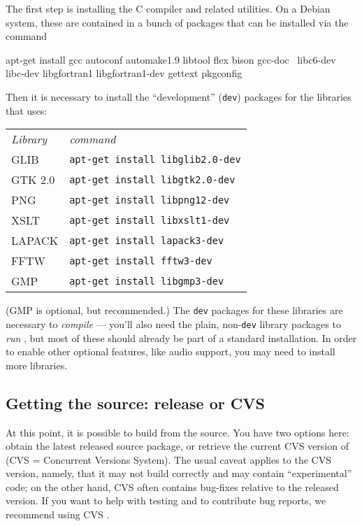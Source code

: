 The first step is installing the C compiler and related utilities. On
a Debian system, these are contained in a bunch of packages that can
be installed via the command
\begin{code}
apt-get install gcc autoconf automake1.9 libtool flex bison gcc-doc \
libc6-dev libc-dev libgfortran1 libgfortran1-dev gettext pkgconfig
\end{code}

Then it is necessary to install the ``development'' (\texttt{dev})
packages for the libraries that \app{gretl} uses:

\begin{center}
  \begin{tabular}{ll}
    \textit{Library} & \textit{command} \\ [4pt]
    GLIB & \texttt{apt-get install libglib2.0-dev} \\
    GTK 2.0 & \texttt{apt-get install libgtk2.0-dev} \\
    PNG & \texttt{apt-get install libpng12-dev} \\
    XSLT & \texttt{apt-get install libxslt1-dev} \\
    LAPACK & \texttt{apt-get install lapack3-dev} \\
    FFTW & \texttt{apt-get install fftw3-dev} \\
    GMP & \texttt{apt-get install libgmp3-dev}
  \end{tabular}
\end{center}

(GMP is optional, but recommended.)  The \texttt{dev} packages for
these libraries are necessary to \emph{compile}  --- you'll
also need the plain, non-\texttt{dev} library packages to \emph{run}
\app{gretl}, but most of these should already be part of a standard
installation.  In order to enable other optional features, like audio
support, you may need to install more libraries.

\subsection{Getting the source: release or CVS}

At this point, it is possible to build from the source.  You have two
options here: obtain the latest released source package, or retrieve
the current CVS version of \app{gretl} (CVS = Concurrent Versions
System).  The usual caveat applies to the CVS version, namely, that it
may not build correctly and may contain ``experimental'' code; on the
other hand, CVS often contains bug-fixes relative to the released
version.  If you want to help with testing and to contribute bug
reports, we recommend using CVS \app{gretl}.

